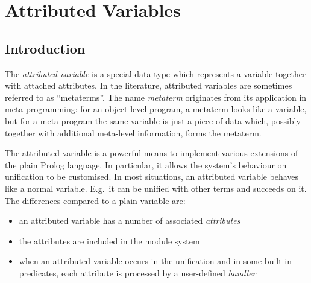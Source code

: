 %
% 
% 
% 
% 

%

\chapter{Attributed Variables}
\label{attrvars}
\label{metaterms}

\section{Introduction}
The {\em attributed variable} is a special \eclipse data type which
represents a variable together with attached attributes.
In the literature, attributed variables are sometimes referred to as
``metaterms''. 
The name {\em metaterm} originates from its application in meta-programming:
for an object-level program, a metaterm looks like a variable, but for
a meta-program the same variable is just a piece of data which, possibly
together with additional meta-level information, forms the metaterm.

The attributed variable is a powerful means to implement various extensions of the
plain Prolog language.
In particular, it allows the system's behaviour
on unification to be customised.
In most situations, an attributed variable behaves like a normal
variable.
E.g.\ it can be unified with other terms and  succeeds on it.
The differences compared to a plain variable are:
\begin{itemize}
\item an attributed variable has a number of associated {\it attributes}
\item the attributes are included in the module system
\item when an attributed variable occurs in the unification and in some
built-in predicates, each attribute is processed by a user-defined
{\it handler}
\end{itemize}

